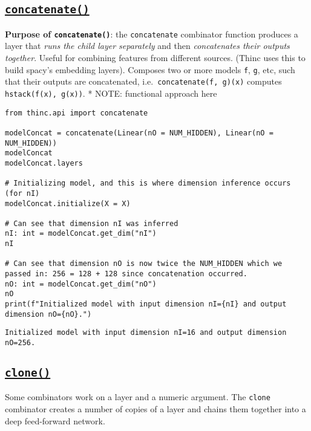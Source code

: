 \documentclass[
]{article}
\begin{document}
\hypertarget{concatenate}{%
\subsection{\texorpdfstring{\href{https://thinc.ai/docs/api-layers\#concatenate}{\texttt{concatenate()}}}{}}\label{concatenate}}

\textbf{Purpose of \texttt{concatenate()}}: the
\texttt{concatenate} combinator function produces a layer
that \emph{runs the child layer separately} and then \emph{concatenates
their outputs together}. Useful for combining features from different
sources. (Thinc uses this to build spacy's embedding layers). Composes
two or more models \texttt{f}, \texttt{g},
etc, such that their outputs are concatenated,
i.e.~\texttt{concatenate(f, g)(x)} computes
\texttt{hstack(f(x), g(x))}. * NOTE: functional approach
here

\begin{verbatim}
from thinc.api import concatenate

modelConcat = concatenate(Linear(nO = NUM_HIDDEN), Linear(nO = NUM_HIDDEN))
modelConcat
modelConcat.layers

# Initializing model, and this is where dimension inference occurs (for nI)
modelConcat.initialize(X = X)

# Can see that dimension nI was inferred
nI: int = modelConcat.get_dim("nI")
nI

# Can see that dimension nO is now twice the NUM_HIDDEN which we passed in: 256 = 128 + 128 since concatenation occurred.
nO: int = modelConcat.get_dim("nO")
nO
print(f"Initialized model with input dimension nI={nI} and output dimension nO={nO}.")
\end{verbatim}

\begin{verbatim}
Initialized model with input dimension nI=16 and output dimension nO=256.
\end{verbatim}

\hypertarget{clone}{%
\subsection{\texorpdfstring{\href{https://thinc.ai/docs/api-layers\#clone}{\texttt{clone()}}}{}}\label{clone}}

Some combinators work on a layer and a numeric argument. The
\texttt{clone} combinator creates a number of copies of a
layer and chains them together into a deep feed-forward network.
\end{document}
